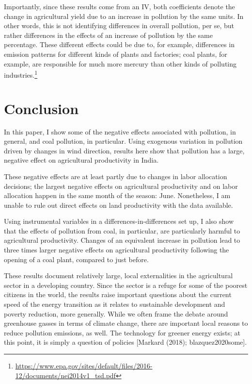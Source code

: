 \documentclass[
]{article}
\begin{document}
Importantly, since these results come from an IV, both coefficients denote the change in agricultural yield due to an increase in pollution by the same units. In other words, this is not identifying differences in overall pollution, per se, but rather differences in the effects of an increase of pollution by the same percentage. These different effects could be due to, for example, differences in emission patterns for different kinds of plants and factories; coal plants, for example, are responsible for much more mercury than other kinds of polluting industries.\footnote{\url{https://www.epa.gov/sites/default/files/2016-12/documents/nei2014v1_tsd.pdf}}

\hypertarget{conclusion}{%
\section{Conclusion}\label{conclusion}}

\label{conclusion}

In this paper, I show some of the negative effects associated with pollution, in general, and coal pollution, in particular. Using exogenous variation in pollution driven by changes in wind direction, results here show that pollution has a large, negative effect on agricultural productivity in India.

These negative effects are at least partly due to changes in labor allocation decisions; the largest negative effects on agricultural productivity and on labor allocation happen in the same month of the season: June. Nonetheless, I am unable to rule out direct effects on land productivity with the data available.

Using instrumental variables in a differences-in-differences set up, I also show that the effects of pollution from coal, in particular, are particularly harmful to agricultural productivity. Changes of an equivalent increase in pollution lead to three times larger negative effects on agricultural productivity following the opening of a coal plant, compared to just before.

These results document relatively large, local externalities in the agricultural sector in a developing country. Since the sector is a refuge for some of the poorest citizens in the world, the results raise important questions about the current speed of the energy transition as it relates to sustainable development and poverty reduction, more generally. While we often frame the debate around greenhouse gasses in terms of climate change, there are important local reasons to reduce pollution emissions, as well. The technology for greener energy exists; at this point, it is simply a question of policies {[}Markard (2018); blazquez2020some{]}.
\end{document}
